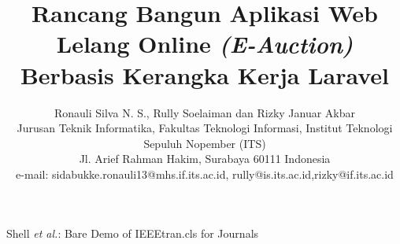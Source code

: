 
\author{Ronauli Silva N. S., Rully Soelaiman dan Rizky Januar Akbar\\
	Jurusan Teknik Informatika, Fakultas Teknologi Informasi, Institut Teknologi Sepuluh Nopember (ITS)\\
	Jl. Arief Rahman Hakim, Surabaya 60111 Indonesia\\
	e-mail: sidabukke.ronauli13@mhs.if.its.ac.id, rully@is.its.ac.id,rizky@if.its.ac.id
	}%


%
{Shell \MakeLowercase{\textit{et al.}}: Bare Demo of IEEEtran.cls for Journals}


\title{Rancang Bangun Aplikasi Web Lelang Online \textit{(E-Auction)} Berbasis Kerangka Kerja Laravel}
\maketitle